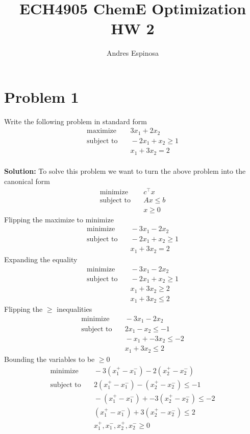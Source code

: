 \documentclass[11pt]{article}
\title{ECH4905 ChemE Optimization HW 2}
\author{Andres Espinosa}
\begin{document}
\maketitle

\section{Problem 1}
Write the following problem in standard form
\begin{align}
  \text{maximize} & \quad 3 x_1 + 2x_2 \\
  \text{subject to} & \quad -2x_1 + x_2 \geq 1 \\
  & \quad x_1 + 3x_2 = 2
\end{align}
\\
\textbf{Solution: }
To solve this problem we want to turn the above problem into the canonical form
\begin{align}
  \text{minimize} & \quad c^\top x \\
  \text{subject to} & \quad Ax \leq b \\
  & \quad x \geq 0
\end{align}
Flipping the maximize to minimize
\begin{align}
  \text{minimize} & \quad -3 x_1 - 2x_2 \\
  \text{subject to} & \quad -2x_1 + x_2 \geq 1 \\
  & \quad x_1 + 3x_2 = 2
\end{align}
Expanding the equality
\begin{align}
  \text{minimize} & \quad -3 x_1 - 2x_2 \\
  \text{subject to} & \quad -2x_1 + x_2 \geq 1 \\
  & \quad x_1 + 3x_2 \geq 2 \\
  & \quad x_1 + 3x_2 \leq 2
\end{align}
Flipping the $\geq$ inequalities
\begin{align}
  \text{minimize} & \quad -3 x_1 - 2x_2 \\
  \text{subject to} & \quad 2x_1 - x_2 \leq -1 \\
  & \quad -x_1 + -3x_2 \leq -2 \\
  & \quad x_1 + 3x_2 \leq 2
\end{align}
Bounding the variables to be $\geq 0$
\begin{align}
  \text{minimize} & \quad -3 (x_1^+ - x_1^-) - 2(x_2^+ - x_2^-) \\
  \text{subject to} & \quad 2(x_1^+ - x_1^-) - (x_2^+ - x_2^-) \leq -1 \\
  & \quad -(x_1^+ - x_1^-) + -3(x_2^+ - x_2^-) \leq -2 \\
  & \quad (x_1^+ - x_1^-) + 3(x_2^+ - x_2^-) \leq 2 \\
  & \quad x_1^+, x_1^-, x_2^+, x_2^- \geq 0
\end{align}
\end{document}
